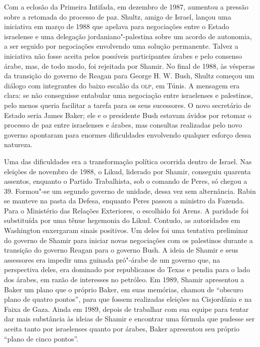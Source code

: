 Com a eclosão da Primeira Intifada, em dezembro de 1987, aumentou a
pressão sobre a retomada do processo de paz. Shultz, amigo de Israel,
lançou uma iniciativa em março de 1988 que apelava para negociações
entre o Estado israelense e uma delegação jordaniano"-palestina sobre um acordo de
autonomia, a ser seguido por negociações envolvendo uma solução
permanente. Talvez a iniciativa não fosse aceita pelos possíveis
participantes árabes e pelo consenso árabe, mas, de todo modo, foi
rejeitada por Shamir. No final de 1988, às vésperas da transição do
governo de Reagan para George H. W. Bush, Shultz começou um diálogo com
integrantes do baixo escalão da \textsc{olp}, em Túnis. A mensagem era clara: se
não conseguisse entabular uma negociação entre israelenses e palestinos,
pelo menos queria facilitar a tarefa para os seus sucessores. O novo
secretário de Estado seria James Baker; ele e o presidente Bush estavam
ávidos por retomar o processo de paz entre israelenses e árabes, mas
consultas realizadas pelo novo governo apontaram para enormes
dificuldades envolvendo qualquer esforço dessa natureza.

Uma das dificuldades era a transformação política ocorrida dentro de
Israel. Nas eleições de novembro de 1988, o Likud, liderado por Shamir,
conseguiu quarenta assentos, enquanto o Partido Trabalhista, sob o comando de
Peres, só chegou a 39. Formou"-se um segundo governo de unidade, dessa
vez sem alternância. Rabin se manteve na pasta da Defesa, enquanto Peres
passou a ministro da Fazenda. Para o Ministério das Relações Exteriores,
o escolhido foi Arens. A paridade foi substituída por uma tênue
hegemonia do Likud. Contudo, as autoridades em Washington enxergaram
sinais positivos. Um deles foi uma tentativa preliminar do governo de
Shamir para iniciar novas negociações com os palestinos durante a
transição do governo Reagan para o governo Bush. A ideia de Shamir e
seus assessores era impedir uma guinada pró"-árabe de um governo que, na
perspectiva deles, era dominado por republicanos do Texas e pendia para
o lado dos árabes, em razão de interesses no petróleo. Em 1989, Shamir
apresentou a Baker um plano que o próprio Baker, em suas memórias,
chamou de ``obscuro plano de quatro pontos'', para que fossem realizadas
eleições na Cisjordânia e na Faixa de Gaza. Ainda em 1989, depois de
trabalhar com sua equipe para tentar dar mais substância às ideias de
Shamir e encontrar uma fórmula que pudesse ser aceita tanto por
israelenses quanto por árabes, Baker apresentou seu próprio ``plano de
cinco pontos''.

